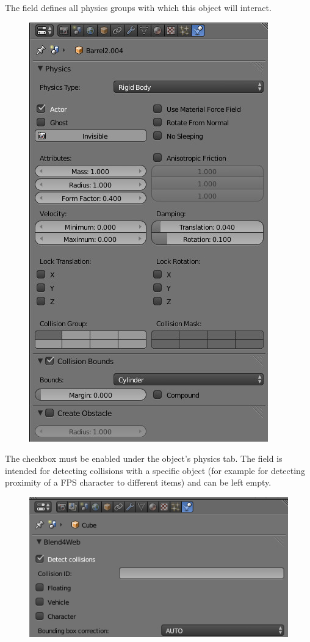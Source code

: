\documentclass[a4paper,12pt,oneside]{sphinxmanual}
\begin{document}
The  field defines all physics groups with which this object will interact.
\begin{figure}[htbp]
\centering

\includegraphics[width=0.800\linewidth]{physics_panel_dynamic.jpg}
\end{figure}

\begin{DUlineblock}{0em}
\item[] 
\end{DUlineblock}

The  checkbox must be enabled under the object's physics tab. The  field is intended for detecting collisions with a specific object (for example for detecting proximity of a FPS character to different items) and can be left empty.
\begin{figure}[htbp]
\centering

\includegraphics[width=0.800\linewidth]{object.jpg}
\end{figure}
\end{document}
